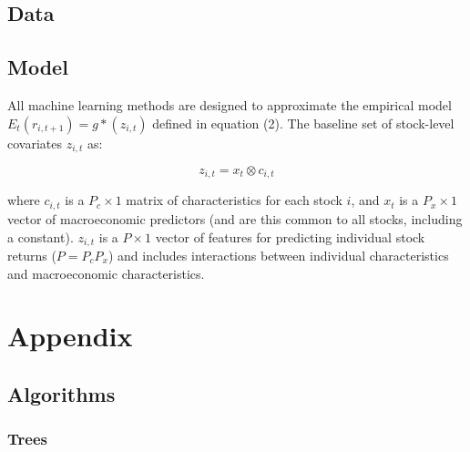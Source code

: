 \documentclass[man, a4paper, biblatex]{apa6}
\begin{document}
\subsection{Data}


\subsection{Model}

All machine learning methods are designed to approximate the empirical model $E_t(r_{i, t+1}) = g*(z_{i,t})$ defined in equation (2). The baseline set of stock-level covariates $z_{i,t}$ as:

\begin{equation}
	z_{i,t} = x_t \otimes c_{i,t}
\end{equation}

where $c_{i,t}$ is a $P_c \times 1$ matrix of characteristics for each stock $i$, and $x_t$ is a $P_x \times 1$ vector of macroeconomic predictors (and are this common to all stocks, including a constant). $z_{i,t}$ is a $P \times 1$ vector of features for predicting individual stock returns ($P = P_cP_x$) and includes interactions between individual characteristics and macroeconomic characteristics. 

\cite{TESL}

\printbibliography

\section{Appendix}

\subsection{Algorithms}

\subsubsection{Trees}
\end{document}
